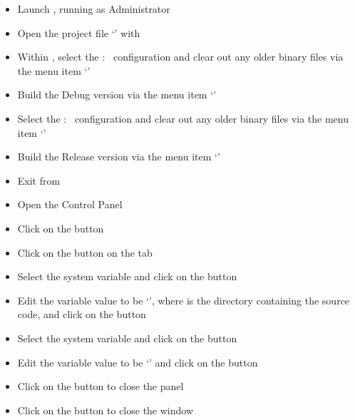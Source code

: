 \begin{itemize}
\item Launch , running as Administrator
\item\exSp{}Open the project file
`' with
\item\exSp{}Within , select the  :\ 
configuration and clear out any older binary files via the menu item
`'
\item\exSp{}Build the Debug version via the menu item
`'
\item\exSp{}Select the  :\  configuration and clear out any
older binary files via the menu item `'
\item\exSp{}Build the Release version via the menu item
`'
\item\exSp{}Exit from 
\item\exSp{}Open the  Control Panel
\item\exSp{}Click on the  button
\item\exSp{}Click on the  button on the 
tab
\item\exSp{}Select the  system variable and click on the
 button 
\item\exSp{}Edit the variable value to be
`', where 
is the directory containing the \mplusm{} source code, and click on the  button
\item\exSp{}Select the  system variable and click on
the  button 
\item\exSp{}Edit the variable value to be
`' and
click on the  button
\item\exSp{}Click on the  button to close the 
panel
\item\exSp{}Click on the  button to close the 
window
\end{itemize}
\tertiaryEnd
{}
